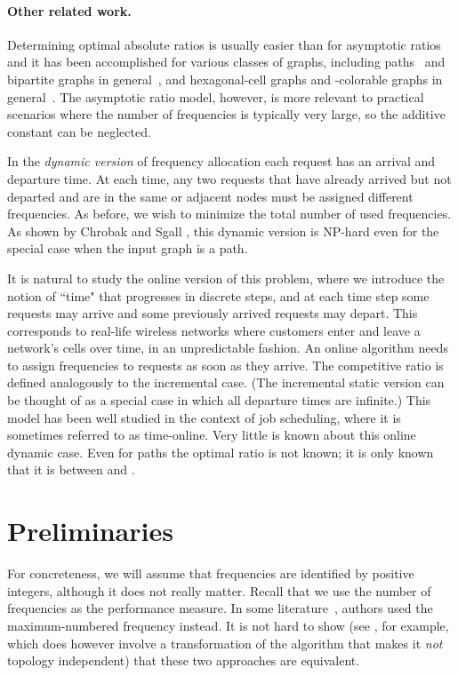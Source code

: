 \documentclass[11pt]{article}
\newcommand{\NP}{{\textsf{NP}}}
\begin{document}
\paragraph{Other related work.}
Determining optimal absolute ratios
is usually easier than for asymptotic ratios and it has been accomplished for
various classes of graphs, including paths~\cite{ChCYZZ06} and bipartite graphs
in general~\cite{ChChYZ07,ChChYZ10}, and hexagonal-cell graphs and -colorable
graphs in general~\cite{ChChYZ07,ChChYZ10}.
The asymptotic ratio model, however, is more relevant to practical scenarios where the
number of frequencies is typically very large, so the additive constant
can be neglected.

In the \emph{dynamic version} of frequency allocation each request
has an arrival and departure time. At each time, any two requests
that have already arrived but not departed and are in the same
or adjacent nodes must be assigned different frequencies. As before,
we wish to minimize the total number of used frequencies.
As shown by Chrobak and Sgall \cite{ChrSga10}, this dynamic
version is {\NP}-hard even for the special case when the input graph is a path. 

It is natural to study the online version of this problem, where
we introduce the notion of ``time" that progresses in discrete steps, and
at each time step some requests may arrive and some previously arrived
requests may depart. This corresponds to real-life wireless networks where
customers enter and leave a network's cells over time, in an unpredictable
fashion. An online algorithm needs to assign frequencies to requests as 
soon as they arrive. The competitive ratio is defined 
analogously to the incremental case. (The incremental static
version can be thought of as
a special case in which all departure times are infinite.)
This model has been well studied in the context of job scheduling, where it is sometimes
referred to as time-online. Very little is known about this online dynamic
case. Even for paths the optimal ratio is not known; it is only known
that it is between  \cite{ChrSga10}
and  \cite{ChCYZZ06}.



\section{Preliminaries}

For concreteness, we will assume that frequencies are identified by
positive integers, although it does not really matter.
Recall that we use the number of frequencies as the performance
measure. In some literature~\cite{ChCYZZ06,ChZhZh07,ChChYZ10},
authors used the maximum-numbered frequency instead. It is not hard to show
(see \cite{ChrSga10}, for example, which does however involve a transformation
of the algorithm that makes it \emph{not} topology independent)
that these two approaches are equivalent.    
\end{document}
